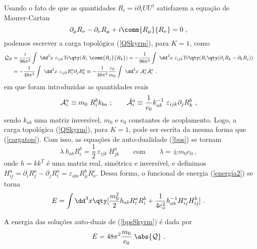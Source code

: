 Usando o fato de que as quantidades $R_i = i\partial_i UU^{\dag}$ satisfazem a equação de Maurer-Cartan
\begin{equation}
    \partial_{\mu}R_\nu - \partial_\nu R_\mu + i \comm{R_\mu}{R_\nu} = 0 \ ,
\end{equation}
podemos escrever a carga topológica (\ref{QSkyrm}), para $K = 1$, como
\begin{equation}
\begin{split}
    \mathcal{Q}_B &= \dfrac{i}{96\pi^2} \int \ \dd^3x \ \varepsilon_{ijk} \text{Tr}\qty(R_i \ \comm{R_j}{R_k}) = -\dfrac{1}{96\pi^2}\int \ \dd^3x \  \varepsilon_{ijk}\text{Tr}\qty(R_i \qty(\partial_jR_k - \partial_k R_j)) \\
    &= -\dfrac{1}{48\pi^2} \int \ \dd^3x \ \varepsilon_{ijk} R_i^a\partial_jR^a_k \equiv -\dfrac{1}{48\pi^2}\dfrac{e_0}{m_0}\int \ \dd^3x \ \mathcal{A}_i^a \Tilde{\mathcal{A}}_i^a \ ,
    \label{QSkyrme2}
\end{split}
\end{equation}
em que foram introduzidas as quantidades reais
\begin{equation}
    \mathcal{A}_i^a \equiv m_0 \ R_i^b k_{ba} \ ; \qquad \Tilde{\mathcal{A}}_i^a \equiv \dfrac{1}{e_0}k^{-1}_{ab} \ \varepsilon_{ijk} \partial_j R_k^b \ ,
\end{equation}
sendo $k_{ab}$ uma matriz inversível, $m_0$ e $e_0$ constantes de acoplamento. Logo, a carga topológica (\ref{QSkyrm}), para $K=1$, pode ser escrita da mesma forma que (\ref{cargatop}). Com isso, as equações de auto-dualidade (\ref{bps}) se tornam
\begin{equation}
    \lambda \ h_{ab} R_i^{b} = \dfrac{1}{2} \ \varepsilon_{ijk} \ H^{a}_{jk} \qquad \text{com} \qquad \lambda = \pm m_0e_0 \ ,
    \label{bpsSkyrm}
\end{equation}
onde $h=kk^T$ é uma matriz real, simétrica e inversível, e definimos $H^{a}_{ij} = \partial_i R_j^{a} - \partial_jR_i^{a} = \varepsilon_{abc}R^{b}_\mu R^{c}_\nu$. Dessa forma, o funcional de energia (\ref{energia2}) se torna
\begin{equation}
    E = \int \dd^3x \qty[\dfrac{m_0^2}{2}h_{ab}R_i^{a}R_i^{b} + \dfrac{1}{4e_o^2}h_{ab}^{-1}H^{a}_{ij}H^{b}_{ij}] \ .
\end{equation}

A energia das soluções auto-duais de (\ref{bpsSkyrm}) é dada por
\begin{equation}
    E = 48\pi^2\dfrac{m_0}{e_0} \ \abs{\mathcal{Q}} \ .
\end{equation}

